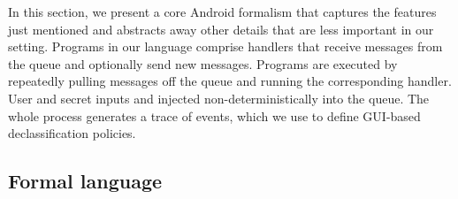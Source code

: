 \documentclass[10pt,conference,compsocconf]{IEEEtran}
\begin{document}
In this section, we present a core Android formalism that captures the
features just mentioned and abstracts away other details that are less
important in our setting.  Programs in our language comprise handlers
that receive messages from the queue and optionally send new
messages. Programs are executed by repeatedly pulling messages off the
queue and running the corresponding handler. User and secret inputs
and injected non-deterministically into the queue. The whole process
generates a trace of events, which we use to define GUI-based
declassification policies.



\subsection{Formal language}
\end{document}
